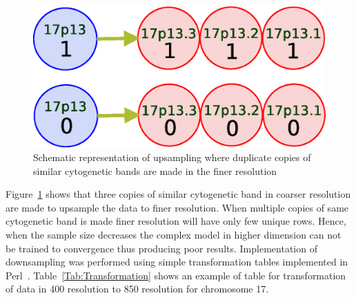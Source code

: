 \begin{figure}[h!]
\centering
\includegraphics[scale=0.4]{figures/upscaling}
\caption[Upsampling]{Schematic representation of upsampling where duplicate copies of similar cytogenetic bands are made in the finer resolution} \label{Fig:upscaling}
\end{figure}

Figure~\ref{Fig:upscaling} shows that three copies of similar cytogenetic band in coarser resolution are made to upsample the data to finer resolution. When multiple copies of same cytogenetic band is made finer resolution will have only few unique rows. Hence, when the sample size decreases the complex model in higher dimension can not be trained to convergence thus producing poor results. Implementation of downsampling was performed using simple transformation tables implemented in Perl~\cite{perl}. Table~\ref{Tab:Transformation} shows an example of table for transformation of data in 400 resolution to 850 resolution for chromosome 17.

